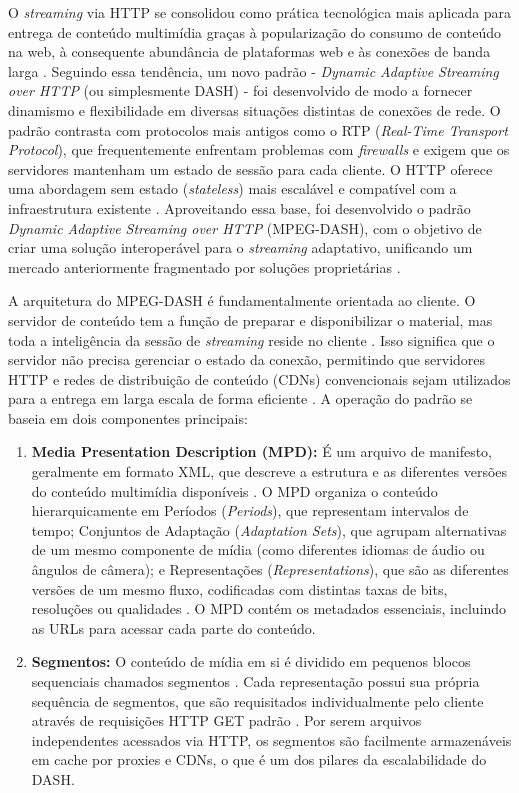O \textit{streaming} via HTTP se consolidou como prática tecnológica mais aplicada para entrega de conteúdo multimídia graças à popularização do consumo de conteúdo na web, à consequente abundância de plataformas web e às conexões de banda larga \cite{thang2012adaptive}. Seguindo essa tendência, um novo padrão - \textit{Dynamic Adaptive Streaming over HTTP} (ou simplesmente DASH) - foi desenvolvido de modo a fornecer dinamismo e flexibilidade em diversas situações distintas de conexões de rede. O padrão contrasta com protocolos mais antigos como o RTP (\textit{Real-Time Transport Protocol}), que frequentemente enfrentam problemas com \textit{firewalls} e exigem que os servidores mantenham um estado de sessão para cada cliente. O HTTP oferece uma abordagem sem estado (\textit{stateless}) mais escalável e compatível com a infraestrutura existente \cite{sodagar2011mpegdash}. Aproveitando essa base, foi desenvolvido o padrão \textit{Dynamic Adaptive Streaming over HTTP} (MPEG-DASH), com o objetivo de criar uma solução interoperável para o \textit{streaming} adaptativo, unificando um mercado anteriormente fragmentado por soluções proprietárias \cite{sodagar2011mpegdash}.

A arquitetura do MPEG-DASH é fundamentalmente orientada ao cliente. O servidor de conteúdo tem a função de preparar e disponibilizar o material, mas toda a inteligência da sessão de \textit{streaming} reside no cliente \cite{stockhammer2011dynamic}. Isso significa que o servidor não precisa gerenciar o estado da conexão, permitindo que servidores HTTP e redes de distribuição de conteúdo (CDNs) convencionais sejam utilizados para a entrega em larga escala de forma eficiente \cite{stockhammer2011dynamic}. A operação do padrão se baseia em dois componentes principais:

\begin{enumerate}
    \item \textbf{Media Presentation Description (MPD):} É um arquivo de manifesto, geralmente em formato XML, que descreve a estrutura e as diferentes versões do conteúdo multimídia disponíveis \cite{sodagar2011mpegdash}. O MPD organiza o conteúdo hierarquicamente em Períodos (\textit{Periods}), que representam intervalos de tempo; Conjuntos de Adaptação (\textit{Adaptation Sets}), que agrupam alternativas de um mesmo componente de mídia (como diferentes idiomas de áudio ou ângulos de câmera); e Representações (\textit{Representations}), que são as diferentes versões de um mesmo fluxo, codificadas com distintas taxas de bits, resoluções ou qualidades \cite{sodagar2011mpegdash}. O MPD contém os metadados essenciais, incluindo as URLs para acessar cada parte do conteúdo.

    \item \textbf{Segmentos:} O conteúdo de mídia em si é dividido em pequenos blocos sequenciais chamados segmentos \cite{sodagar2011mpegdash}. Cada representação possui sua própria sequência de segmentos, que são requisitados individualmente pelo cliente através de requisições HTTP GET padrão \cite{stockhammer2011dynamic}. Por serem arquivos independentes acessados via HTTP, os segmentos são facilmente armazenáveis em cache por proxies e CDNs, o que é um dos pilares da escalabilidade do DASH.
\end{enumerate}

